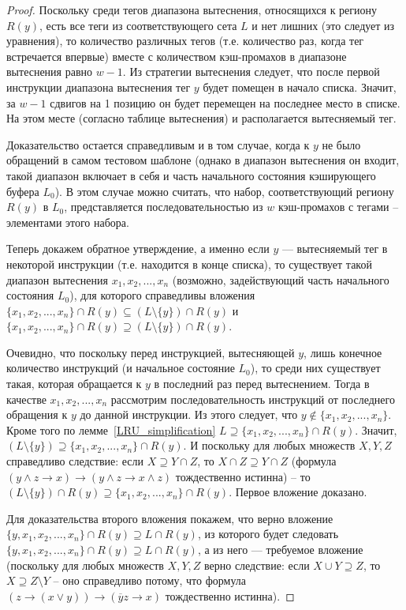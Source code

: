 \begin{proof}
  Поскольку среди тегов диапазона вытеснения, относящихся к региону $R(y)$,
  есть все теги из соответствующего сета $L$ и
  нет лишних (это следует из уравнения), то количество различных
  тегов (т.е. количество раз, когда тег встречается впервые) вместе с
  количеством кэш-промахов в диапазоне вытеснения равно $w-1$. Из
  стратегии вытеснения следует, что после первой инструкции
  диапазона вытеснения тег $y$ будет помещен в начало списка.
  Значит, за $w-1$ сдвигов на 1 позицию он будет перемещен на
  последнее место в списке. На этом месте (согласно таблице вытеснения)
  и располагается вытесняемый тег.

  Доказательство остается справедливым и в том случае, когда к $y$
  не было обращений в самом тестовом шаблоне (однако в диапазон
  вытеснения он входит, такой диапазон включает в себя и часть
  начального состояния кэширующего буфера $L_0$). В этом случае
  можно считать, что набор, соответствующий региону $R(y)$ в $L_0$,
  представляется последовательностью из $w$ кэш-промахов с тегами --
  элементами этого набора.

  Теперь докажем обратное утверждение, а именно если $y$ --- вытесняемый
  тег в некоторой инструкции (т.е. находится в конце списка), то
  существует такой диапазон вытеснения $x_1, x_2, ..., x_n$
  (возможно, задействующий часть начального состояния $L_0$), для
  которого справедливы вложения $\{x_1, x_2, ..., x_n\} \cap R(y) \subseteq
  (L\setminus\{y\}) \cap R(y)$ и $\{x_1, x_2, ..., x_n\} \cap R(y) \supseteq
  (L\setminus\{y\}) \cap R(y)$.

  Очевидно, что поскольку перед инструкцией, вытесняющей $y$, лишь
  конечное количество инструкций (и начальное состояние $L_0$), то
  среди них существует такая, которая обращается к $y$ в последний
  раз перед вытеснением. Тогда в качестве $x_1, x_2, ..., x_n$
  рассмотрим последовательность инструкций от последнего обращения к
  $y$ до данной инструкции. Из этого следует, что $y \notin \{x_1,
  x_2, ..., x_n\}$. Кроме того по лемме~\ref{LRU_simplification} $L
  \supseteq \{x_1, x_2, ..., x_n\} \cap R(y)$. Значит,
  $(L\setminus\{y\}) \supseteq \{x_1, x_2, ..., x_n\} \cap R(y)$. И
  поскольку для любых множеств $X, Y, Z$ справедливо следствие: если
  $X \supseteq Y \cap Z$, то $X\cap Z \supseteq Y \cap Z$ (формула
  $(y \wedge z \rightarrow x) \rightarrow (y \wedge z \rightarrow x
  \wedge z)$ тождественно истинна) -- то $(L\setminus\{y\}) \cap
  R(y) \supseteq \{x_1, x_2, ..., x_n\} \cap R(y)$. Первое вложение
  доказано.

  Для доказательства второго вложения покажем, что верно вложение\\
  $\{y, x_1, x_2, ..., x_n\} \cap R(y) \supseteq L \cap R(y)$, из
  которого будет следовать\\ $\{y, x_1, x_2, ..., x_n\} \cap R(y) \supseteq L \cap
  R(y)$, а из него --- требуемое вложение (поскольку для любых
  множеств $X, Y, Z$ верно следствие: если $X \cup Y\supseteq Z$,
  то $X \supseteq Z \setminus Y$ -- оно справедливо потому, что
  формула $(z \rightarrow (x \vee y))\rightarrow(\overline{y}z\rightarrow x)$
  тождественно истинна).


\end{proof}
